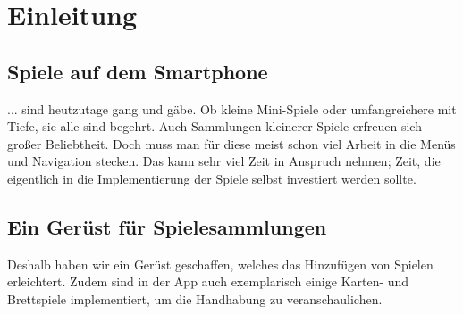 \chapter{Einleitung}

\section{Spiele auf dem Smartphone}
... sind heutzutage gang und gäbe. Ob kleine Mini-Spiele oder umfangreichere mit
Tiefe, sie alle sind begehrt. Auch Sammlungen kleinerer Spiele erfreuen sich
großer Beliebtheit.  Doch muss man für diese meist schon viel Arbeit in die
Menüs und Navigation stecken. Das kann sehr viel Zeit in Anspruch nehmen; Zeit,
die eigentlich in die Implementierung der Spiele selbst investiert werden
sollte.

\section{Ein Gerüst für Spielesammlungen}
Deshalb haben wir ein Gerüst geschaffen, welches das Hinzufügen von Spielen
erleichtert. Zudem sind in der App auch exemplarisch einige Karten- und
Brettspiele implementiert, um die Handhabung zu veranschaulichen.